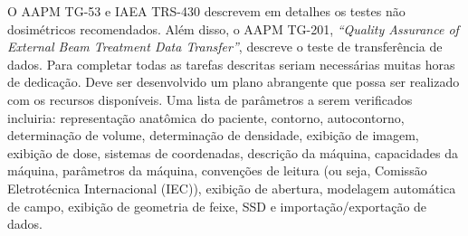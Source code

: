\documentclass[11pt,a4paper]{article}
\begin{document}
	O AAPM TG-53 e IAEA TRS-430 descrevem em detalhes os testes não dosimétricos recomendados. Além disso, o AAPM TG-201, \textit{``Quality Assurance of External Beam Treatment Data Transfer''}, descreve o teste de transferência de dados. Para completar todas as tarefas descritas seriam necessárias muitas horas de dedicação. Deve ser desenvolvido um plano abrangente que possa ser realizado com os recursos disponíveis. Uma lista de parâmetros a serem verificados incluiria: representação anatômica do paciente, contorno, autocontorno, determinação de volume, determinação de densidade, exibição de imagem, exibição de dose, sistemas de coordenadas, descrição da máquina, capacidades da máquina, parâmetros da máquina, convenções de leitura (ou seja, Comissão Eletrotécnica Internacional (IEC)), exibição de abertura, modelagem automática de campo, exibição de geometria de feixe, SSD e importação/exportação de dados.
\end{document}
